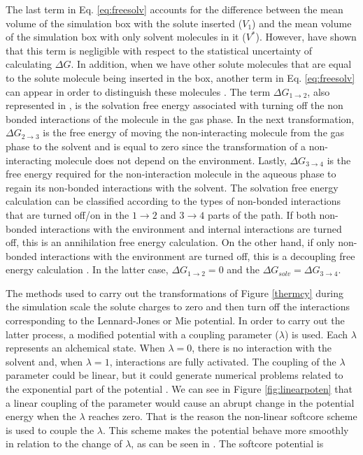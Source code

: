 The last term in Eq. \ref{eq:freesolv} accounts for the difference between the mean volume of the simulation box with the solute inserted ($V_{1}$) and the mean volume of the simulation box with only solvent molecules in it ($V^{*}$). However,  have shown that this term is negligible with respect to the statistical uncertainty of calculating $\Delta G$. In addition, when we have other solute molecules that are equal to the solute molecule being inserted in the box, another term in Eq. \ref{eq:freesolv} can appear in order to distinguish these molecules \cite{shirts2013}. The  term $\Delta G_{1 \rightarrow 2}$, also represented in ,  is the solvation free energy associated with turning off the non bonded interactions of the molecule in the gas phase. In the next transformation, $\Delta G_{2 \rightarrow 3}$ is the free energy of moving the non-interacting molecule from the gas phase to the solvent and is equal to zero since the transformation of a non-interacting molecule does not depend on the environment. Lastly, $\Delta G_{3 \rightarrow 4}$ is the free energy required for the non-interaction molecule in the aqueous phase to regain its non-bonded interactions with the solvent.  The solvation free energy calculation can be classified according to the types of non-bonded interactions that are turned off/on in the $1 \rightarrow 2$ and $ 3 \rightarrow 4$ parts of the path. If both non-bonded interactions with the environment and internal interactions are turned off, this is an annihilation free energy calculation. On the other hand, if only non-bonded interactions with the environment are turned off, this is a decoupling free energy calculation \cite{klimovich}. In the latter case, $\Delta G_{1 \rightarrow 2} = 0$ and the $\Delta G_{solv} = \Delta G_{3 \rightarrow 4} $.  

The methods used to carry out the transformations of Figure \ref{thermcy} during the simulation scale the solute charges to zero and then turn off the interactions corresponding to the Lennard-Jones or Mie potential. In order to carry out the latter process, a modified potential with a coupling parameter ($\lambda$) is used. Each $\lambda$ represents an alchemical state. When $\lambda=0$, there is no interaction with the solvent and, when $\lambda=1$, interactions are fully activated. The coupling of the $\lambda$ parameter could be linear, but it could generate numerical problems related to the exponential part of the potential \cite{shirts2013}. We can see in Figure \ref{fig:linearpoten} that a linear coupling of the parameter would cause an abrupt change in the potential energy when the $\lambda$ reaches zero. That is the reason the non-linear softcore scheme \cite{beutler1994} is used to couple the $\lambda$. This scheme makes the potential behave more smoothly in relation to the change of $\lambda$, as can be seen in . The softcore potential is  

